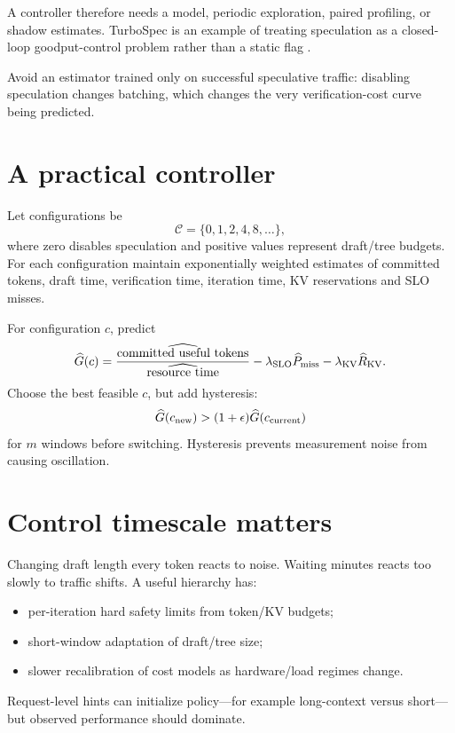 A controller therefore needs a model, periodic exploration, paired profiling, or
shadow estimates. TurboSpec is an example of treating speculation as a closed-loop
goodput-control problem rather than a static flag \cite{liu2024turbospec}.

Avoid an estimator trained only on successful speculative traffic: disabling
speculation changes batching, which changes the very verification-cost curve being
predicted.

\section{A practical controller}

Let configurations be
\[
\mathcal C=\{0,1,2,4,8,\ldots\},
\]
where zero disables speculation and positive values represent draft/tree budgets.
For each configuration maintain exponentially weighted estimates of committed tokens,
draft time, verification time, iteration time, KV reservations and SLO misses.

For configuration $c$, predict
\[
\widehat G(c)=
\frac{\widehat{\text{committed useful tokens}}}
{\widehat{\text{resource time}}}
-\lambda_{\rm SLO}\widehat P_{\rm miss}
-\lambda_{\rm KV}\widehat R_{\rm KV}.
\]
Choose the best feasible $c$, but add hysteresis:
\[
\widehat G(c_{\rm new}) >
(1+\epsilon)\widehat G(c_{\rm current})
\]
for $m$ windows before switching. Hysteresis prevents measurement noise from causing
oscillation.


\section{Control timescale matters}

Changing draft length every token reacts to noise. Waiting minutes reacts too slowly to
traffic shifts. A useful hierarchy has:
\begin{itemize}
\item per-iteration hard safety limits from token/KV budgets;
\item short-window adaptation of draft/tree size;
\item slower recalibration of cost models as hardware/load regimes change.
\end{itemize}
Request-level hints can initialize policy---for example long-context versus short---but
observed performance should dominate.

